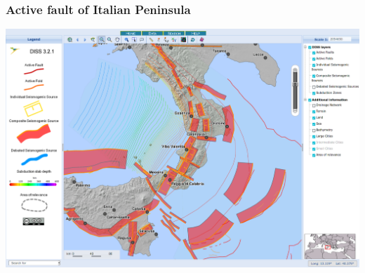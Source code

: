 \documentclass[10pt]{beamer}
\begin{document}
\begin{frame}
  \frametitle{Active fault of Italian Peninsula}
  \centering
  \includegraphics[width=\linewidth]{italy-2.png}
\end{frame}


\end{document}
